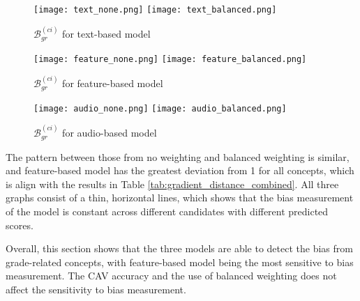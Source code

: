 \begin{figure}[H]
    \centering
    \begin{minipage}[t]{0.32\textwidth}
        \centering
        \texttt{[image: text\_none.png]}
        \hfill
        \texttt{[image: text\_balanced.png]}
        \caption{$\mathcal{B}^{(ci)}_{gr}$ for text-based model}
        \label{fig:gradient_distance_text}
    \end{minipage}
    \hfill
    \begin{minipage}[t]{0.32\textwidth}
        \centering
        \texttt{[image: feature\_none.png]}
        \hfill
        \texttt{[image: feature\_balanced.png]}
        \caption{$\mathcal{B}^{(ci)}_{gr}$ for feature-based model}
        \label{fig:gradient_distance_feature}
    \end{minipage}
    \hfill
    \begin{minipage}[t]{0.32\textwidth}
        \centering
        \texttt{[image: audio\_none.png]}
        \hfill
        \texttt{[image: audio\_balanced.png]}
        \caption{$\mathcal{B}^{(ci)}_{gr}$ for audio-based model}
        \label{fig:gradient_distance_audio}
    \end{minipage}
\end{figure}


The pattern between those from no weighting and balanced weighting is similar, and feature-based model has the greatest deviation from 1 for all concepts, which is align with the results in Table \ref{tab:gradient_distance_combined}. All three graphs consist of a thin, horizontal lines, which shows that the bias measurement of the model is constant across different candidates with different predicted scores.

Overall, this section shows that the three models are able to detect the bias from grade-related concepts, with feature-based model being the most sensitive to bias measurement. The CAV accuracy and the use of balanced weighting does not affect the sensitivity to bias measurement.

